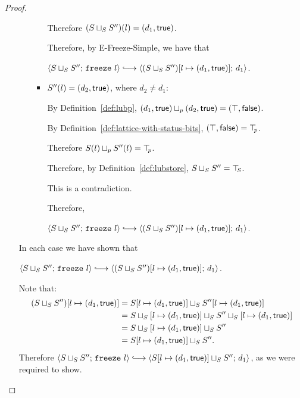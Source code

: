 \begin{proof}
\begin{itemize}
\begin{itemize}
\begin{itemize}
          Therefore $(S \sqcup_{S} S'')(l) =
          (d_1, \textsf{true})$.

          Therefore, by {\sc E-Freeze-Simple}, we have that

          $\config{\lubstore{S}{S''}}{\freeze{l}}
          \parstepsto
          \config{\extS{(\lubstore{S}{S''})}{l}{d_1}{\frozentrue}}{d_1}$.

        \item $S''(l) = (d_2, \textsf{true})$, where $d_2 \neq d_1$:

          By Definition~\ref{def:lubp},
          $(d_1, \textsf{true}) \sqcup_p (d_2, \textsf{true})
          = (\top, \textsf{false})$.

          By Definition~\ref{def:lattice-with-status-bits},
          $(\top, \textsf{false}) = \top\hspace{-0.85mm}_{p}$.

          Therefore $S(l) \sqcup_p S''(l) = \top\hspace{-0.85mm}_{p}$.

          Therefore, by Definition~\ref{def:lubstore},
          $S \sqcup_{S} S'' = \top\hspace{-0.85mm}_{S}$.

          This is a contradiction.

          Therefore,

          $\config{\lubstore{S}{S''}}{\freeze{l}}
          \parstepsto
          \config{\extS{(\lubstore{S}{S''})}{l}{d_1}{\frozentrue}}{d_1}$.
        \end{itemize}
      \end{itemize}

      In each case we have shown that

      $\config{\lubstore{S}{S''}}{\freeze{l}} \parstepsto
      \config{\extS{(\lubstore{S}{S''})}{l}{d_1}{\frozentrue}}{d_1}$.

      Note that:
      \begin{align*}
        (S \sqcup_{S} S'')[l \mapsto (d_1, \textsf{true})] &=
        S[l \mapsto (d_1, \textsf{true})] \sqcup_{S} S''[l \mapsto (d_1, \textsf{true})] \\
        &= S \sqcup_{S} \left[ l \mapsto (d_1, \textsf{true}) \right] \sqcup_{S} S'' \sqcup_{S} \left[ l \mapsto (d_1, \textsf{true}) \right] \\
        &= S \sqcup_{S} \left[ l \mapsto (d_1, \textsf{true}) \right] \sqcup_{S} S'' \\
        &= S[l \mapsto (d_1, \textsf{true})] \sqcup_{S} S''.
      \end{align*}
      Therefore
      $\config{\lubstore{S}{S''}}{\freeze{l}}
      \parstepsto
      \config{\lubstore{\extS{S}{l}{d_1}{\frozentrue}}{S''}}{d_1}$,
      as we were required to show.
  \end{itemize}
\end{proof}
